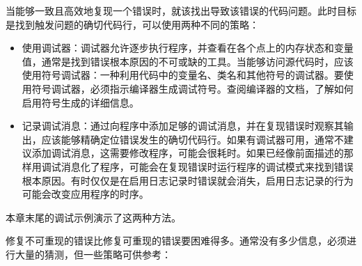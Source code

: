
当能够一致且高效地复现一个错误时，就该找出导致该错误的代码问题。此时目标是找到触发问题的确切代码行，可以使用两种不同的策略：

\begin{itemize}
\item
使用调试器：调试器允许逐步执行程序，并查看在各个点上的内存状态和变量值，通常是找到错误根本原因的不可或缺的工具。当能够访问源代码时，应该使用符号调试器：一种利用代码中的变量名、类名和其他符号的调试器。要使用符号调试器，必须指示编译器生成调试符号。查阅编译器的文档，了解如何启用符号生成的详细信息。

\item
记录调试消息：通过向程序中添加足够的调试消息，并在复现错误时观察其输出，应该能够精确定位错误发生的确切代码行。如果有调试器可用，通常不建议添加调试消息，这需要修改程序，可能会很耗时。如果已经像前面描述的那样用调试消息化了程序，可能会在复现错误时运行程序的调试模式来找到错误根本原因。有时仅仅是在启用日志记录时错误就会消失，启用日志记录的行为可能会改变应用程序的时序。
\end{itemize}

本章末尾的调试示例演示了这两种方法。


修复不可重现的错误比修复可重现的错误要困难得多。通常没有多少信息，必须进行大量的猜测，但一些策略可供参考：

